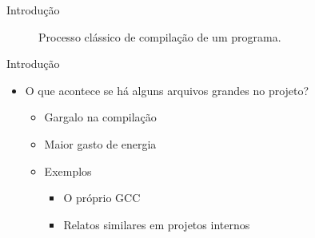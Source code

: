 \begin{frame}{Introdução}
\begin{figure}
\begin{center}
{
}
\end{center}
\caption{Processo clássico de compilação de um programa.}
\label{fig:classical_build}
\end{figure}
\end{frame}

\begin{frame}{Introdução}
    \begin{itemize}
        \item O que acontece se há alguns arquivos grandes no projeto?
        \begin{itemize}
            \item Gargalo na compilação
            \item Maior gasto de energia
            \item Exemplos
                \begin{itemize}
                    \item O próprio GCC
                    \item Relatos similares em projetos internos \citep{mailgcc}
                \end{itemize}
        \end{itemize}
    \end{itemize}
\end{frame}

